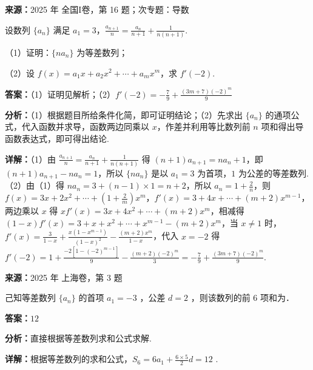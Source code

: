 \begin{question}[points=15]
\textbf{来源：}2025 年 全国I卷，第 16 题；次专题：导数\par
设数列 $\{a_n\}$ 满足 $a_1 = 3$，$\frac{a_{n+1}}{n} = \frac{a_n}{n+1} + \frac{1}{n(n+1)}$.



（1）证明：$\{na_n\}$ 为等差数列；



（2）设 $f(x) = a_1 x + a_2 x^2 + \cdots + a_m x^m$，求 $f'(-2)$.
\begin{solution}
\textbf{答案：}（1）证明见解析；（2）$f'(-2) = -\frac{7}{9} + \frac{(3m+7)(-2)^m}{9}$

\textbf{分析：}（1）根据题目所给条件化简，即可证明结论；（2）先求出 $\{a_n\}$ 的通项公式，代入函数并求导，函数两边同乘以 $x$，作差并利用等比数列前 $n$ 项和得出导函数表达式，即可得出结论.

\textbf{详解：}（1）由 $\frac{a_{n+1}}{n} = \frac{a_n}{n+1} + \frac{1}{n(n+1)}$ 得 $(n+1)a_{n+1} = na_n + 1$，即 $(n+1)a_{n+1} - na_n = 1$，所以 $\{na_n\}$ 是以 $a_1=3$ 为首项，$1$ 为公差的等差数列.
（2）由（1）得 $na_n = 3 + (n-1)\times1 = n+2$，所以 $a_n = 1 + \frac{2}{n}$，则 $f(x) = 3x + 2x^2 + \cdots + \left(1+\frac{2}{m}\right)x^m$，$f'(x) = 3 + 4x + \cdots + (m+2)x^{m-1}$，两边乘以 $x$ 得 $xf'(x) = 3x + 4x^2 + \cdots + (m+2)x^m$，相减得 $(1-x)f'(x) = 3 + x + x^2 + \cdots + x^{m-1} - (m+2)x^m$，当 $x \neq 1$ 时，$f'(x) = \frac{3}{1-x} + \frac{x(1-x^{m-1})}{(1-x)^2} - \frac{(m+2)x^m}{1-x}$，代入 $x = -2$ 得 $f'(-2) = 1 + \frac{-2[1-(-2)^{m-1}]}{9} - \frac{(m+2)(-2)^m}{3} = -\frac{7}{9} + \frac{(3m+7)(-2)^m}{9}$.
\end{solution}
\end{question}

\begin{question}[points=4]
\textbf{来源：}2025 年 上海卷，第 3 题\par
己知等差数列 $\{a_n\}$ 的首项 $a_1 = -3$ ，公差 $d = 2$ ，则该数列的前 $6$ 项和为．
\fillin[{$12$}]
\begin{solution}
\textbf{答案：}$12$

\textbf{分析：}直接根据等差数列求和公式求解.

\textbf{详解：}根据等差数列的求和公式，$S_6 = 6a_1 + \frac{6 \times 5}{2} d = 12$ .
\end{solution}
\end{question}


